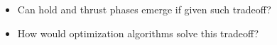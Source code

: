   \begin{itemize}
    \item Can hold and thrust phases emerge if given such tradeoff?
    \begin{description}
      \item
    \end{description}

    \item How would optimization algorithms solve this tradeoff?
    \begin{description}
      \item
    \end{description}
  \end{itemize}
